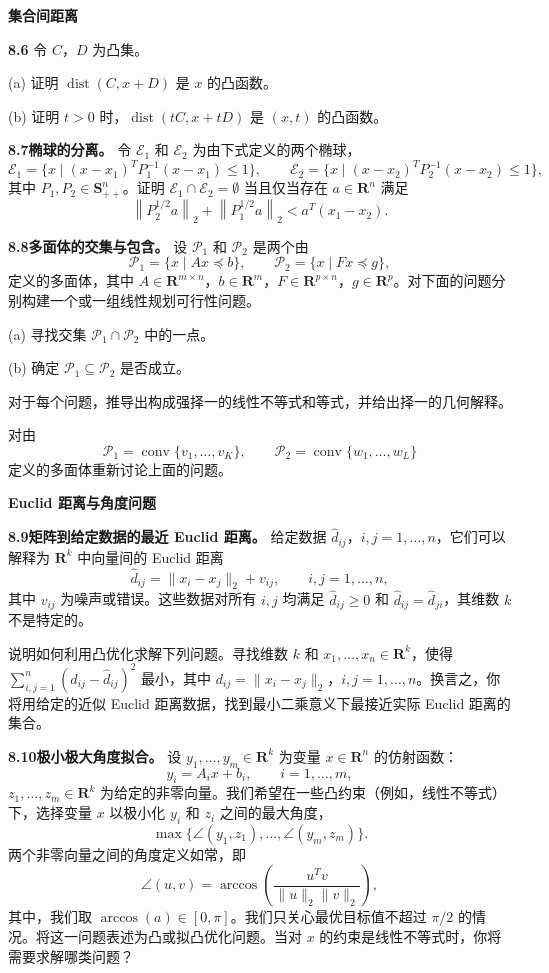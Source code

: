 \documentclass[UTF8, 12pt, fontset=fandol, oneside]{ctexart}
\begin{document}
\noindent\textbf{集合间距离}

\noindent\textbf{8.6}
令 $C$，$D$ 为凸集。

(a) 证明 $\operatorname{dist}(C,x+D)$ 是 $x$ 的凸函数。

(b) 证明 $t>0$ 时，$\operatorname{dist}(tC,x+tD)$ 是 $(x,t)$ 的凸函数。

\noindent\textbf{8.7\quad 椭球的分离。}
令 $\mathcal E_1$ 和 $\mathcal E_2$ 为由下式定义的两个椭球，
\[
\mathcal E_1=\{x\mid (x-x_1)^TP_1^{-1}(x-x_1)\leq 1\},\qquad
\mathcal E_2=\{x\mid (x-x_2)^TP_2^{-1}(x-x_2)\leq 1\},
\]
其中 $P_1,P_2\in\mathbf{S}_{++}^n$。证明 $\mathcal E_1\cap\mathcal E_2=\emptyset$ 当且仅当存在 $a\in\mathbf{R}^n$ 满足
\[
\left\|P_2^{1/2}a\right\|_2+\left\|P_1^{1/2}a\right\|_2<a^T(x_1-x_2).
\]

\noindent\textbf{8.8\quad 多面体的交集与包含。}
设 $\mathcal P_1$ 和 $\mathcal P_2$ 是两个由
\[
\mathcal P_1=\{x\mid Ax\preceq b\},\qquad \mathcal P_2=\{x\mid Fx\preceq g\},
\]
定义的多面体，其中 $A\in\mathbf{R}^{m\times n}$，$b\in\mathbf{R}^m$，$F\in\mathbf{R}^{p\times n}$，$g\in\mathbf{R}^p$。对下面的问题分别构建一个或一组线性规划可行性问题。

(a) 寻找交集 $\mathcal P_1\cap\mathcal P_2$ 中的一点。

(b) 确定 $\mathcal P_1\subseteq\mathcal P_2$ 是否成立。

对于每个问题，推导出构成强择一的线性不等式和等式，并给出择一的几何解释。

对由
\[
\mathcal P_1=\operatorname{conv}\{v_1,\ldots,v_K\},\qquad
\mathcal P_2=\operatorname{conv}\{w_1,\ldots,w_L\}
\]
定义的多面体重新讨论上面的问题。

\noindent\textbf{Euclid 距离与角度问题}

\noindent\textbf{8.9\quad 矩阵到给定数据的最近 Euclid 距离。}
给定数据 $\hat d_{ij}$，$i,j=1,\ldots,n$，它们可以解释为 $\mathbf{R}^k$ 中向量间的 Euclid 距离
\[
\hat d_{ij}=\|x_i-x_j\|_2+v_{ij},\qquad i,j=1,\ldots,n,
\]
其中 $v_{ij}$ 为噪声或错误。这些数据对所有 $i,j$ 均满足 $\hat d_{ij}\geq 0$ 和 $\hat d_{ij}=\hat d_{ji}$，其维数 $k$ 不是特定的。

说明如何利用凸优化求解下列问题。寻找维数 $k$ 和 $x_1,\ldots,x_n\in\mathbf{R}^k$，使得 $\sum_{i,j=1}^n(d_{ij}-\hat d_{ij})^2$ 最小，其中 $d_{ij}=\|x_i-x_j\|_2$，$i,j=1,\ldots,n$。换言之，你将用给定的近似 Euclid 距离数据，找到最小二乘意义下最接近实际 Euclid 距离的集合。

\noindent\textbf{8.10\quad 极小极大角度拟合。}
设 $y_1,\ldots,y_m\in\mathbf{R}^k$ 为变量 $x\in\mathbf{R}^n$ 的仿射函数：
\[
y_i=A_ix+b_i,\qquad i=1,\ldots,m,
\]
$z_1,\ldots,z_m\in\mathbf{R}^k$ 为给定的非零向量。我们希望在一些凸约束（例如，线性不等式）下，选择变量 $x$ 以极小化 $y_i$ 和 $z_i$ 之间的最大角度，
\[
\max\{\angle(y_1,z_1),\ldots,\angle(y_m,z_m)\}.
\]
两个非零向量之间的角度定义如常，即
\[
\angle(u,v)=\arccos\left(\frac{u^Tv}{\|u\|_2\|v\|_2}\right),
\]
其中，我们取 $\arccos(a)\in[0,\pi]$。我们只关心最优目标值不超过 $\pi/2$ 的情况。将这一问题表述为凸或拟凸优化问题。当对 $x$ 的约束是线性不等式时，你将需要求解哪类问题？
\end{document}
